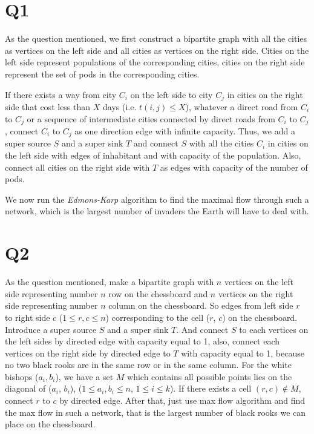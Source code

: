 \documentclass[a4paper]{article}
\begin{document}
	\section*{Q1}
 	
 	As the question mentioned, we first construct a bipartite graph with all the cities as vertices on the left side and all cities as vertices on the right side. Cities on the left side represent populations of the corresponding cities, cities on the right side represent the set of pods in the corresponding cities.
 	
 	 If there exists a way from city $C_i$ on the left side to city $C_j$ in cities on the right side that cost less than $X$ days (i.e. $t(i,j) \leq X$), whatever a direct road from $C_i$ to $C_j$ or a sequence of intermediate cities connected by direct roads from $C_i$ to $C_j$, connect $C_i$ to $C_j$ as one direction edge with infinite capacity. Thus, we add a super source $S$ and a super sink $T$ and connect $S$ with all the cities $C_i$ in cities on the left side with edges of inhabitant and with capacity of the population. Also, connect all cities on the right side with $T$ as edges with capacity of the number of pods.
 	
 	We now run the \textit{Edmons-Karp} algorithm to find the maximal flow through such a network, which is the largest number of invaders the Earth will have to deal with.

	\section*{Q2}
	
	As the question mentioned, make a bipartite graph with $n$ vertices on the left side representing number $n$ row on the chessboard and $n$ vertices on the right side representing number $n$ column on the chessboard. So edges from left side $r$ to right side $c$ ($1\leq r,c\leq n$) corresponding to the cell ($r$, $c$) on the chessboard. Introduce a super source $S$ and a super sink $T$. And connect $S$ to each vertices on the left sides by directed edge with capacity equal to 1, also, connect each vertices on the right side by directed edge to $T$ with capacity equal to 1, because no two black rooks are in the same row or in the same column. For the white bishops ($a_i, b_i$), we have a set $M$ which contains all possible points lies on the diagonal of ($a_i$, $b_i$), ($1\leq a_i,b_i \leq n$, $1 \leq i \leq k$). If there exists a cell $(r,c) \notin M$, connect $r$ to $c$ by directed edge. After that, just use max flow algorithm and find the max flow in such a network, that is the largest number of black rooks we can place on the chessboard.
	
\end{document}
